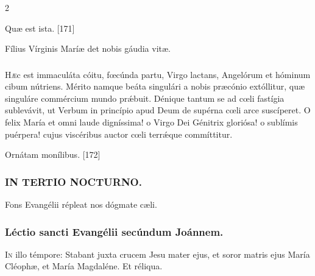\documentclass[9pt,twoside]{extarticle}
\begin{document}
\begin{multicols}{2}
\begin{tightlist}{}
\item {} Quæ est ista. [171]
\item {\small {} Fílius Vírginis Maríæ det nobis gáudia vitæ.}
\end{tightlist}

\subsubsection*{\center {}}
\lettrine{H}æc est immaculáta cóitu, fœcúnda partu, Virgo lactans, Angelórum et hóminum cibum nútriens. Mérito namque beáta singulári a nobis præcónio extóllitur, quæ singuláre commércium mundo prǽbuit. Dénique tantum se ad cœli fastígia sublevávit, ut Verbum in princípio apud Deum de supérna cœli arce suscíperet. O felix María et omni laude digníssima! o Virgo Dei Génitrix gloriósa! o sublímis puérpera! cujus viscéribus auctor cœli terrǽque commíttitur.

\begin{tightlist}{}
\item {} Ornátam monílibus. [172]
\end{tightlist}

\subsubsection*{\center \textsc{IN TERTIO NOCTURNO.}}
\begin{tightlist}{}
\item {\small {} Fons Evangélii répleat nos dógmate cæli.}
\end{tightlist}
\subsubsection*{\center Léctio sancti Evangélii secúndum Joánnem.}
\begin{center}\end{center}
\lettrine{I}n illo témpore: Stabant juxta crucem Jesu mater ejus, et soror matris ejus María Cléophæ, et María Magdaléne. Et réliqua.


\end{multicols}
\end{document}
